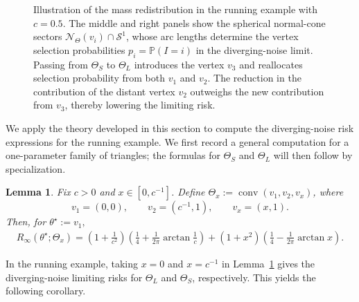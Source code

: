 \documentclass[11pt]{article}
\theoremstyle{plain}
\newtheorem{lemma}[theorem]{Lemma}
\theoremstyle{definition}
\newcommand{\mcN}{\mathcal{N}}
\newcommand{\inparen}[1]{\left(#1\right)}             %
\begin{document}
\begin{figure}
\caption{
Illustration of the mass redistribution in the running example with $c=0.5$. The middle and right panels show the spherical normal-cone sectors
$\mcN_\Theta(v_i)\cap\mathcal S^1$, whose arc lengths determine the vertex selection probabilities $p_i=\mathbb P(I=i)$ in the diverging-noise limit. Passing from $\Theta_S$ to $\Theta_L$ introduces the vertex $v_3$ and reallocates selection probability from both $v_1$ and $v_2$. The reduction in the contribution of the distant vertex $v_2$ outweighs the new contribution from $v_3$, thereby lowering the limiting risk.
}
\label{fig:angular-mass-redistribution}
\end{figure}


We apply the theory developed in this section to compute the diverging-noise risk expressions for the running example. We first record a general computation for a one-parameter family of triangles; the formulas for $\Theta_S$ and $\Theta_L$ will then follow by specialization.

\begin{lemma}\label{lem:ThetaARisk}
Fix $c>0$ and $x \in [0,c^{-1}]$. Define $\Theta_x := \operatorname{conv}(v_1, v_2, v_x)$, where
\[
v_1 = (0,0), \qquad
v_2 = (c^{-1},1), \qquad
v_x = (x,1).
\] 
Then, for $\theta^\star := v_1,$
\begin{align*}
R_\infty(\theta^\star; \Theta_x)
=
\inparen{1+\frac{1}{c^2}} \left(\frac14 + \frac{1}{2\pi} \arctan \frac1c \right)
+ (1+x^2)\left(\frac14 - \frac{1}{2\pi} \arctan x\right).
\end{align*}
\end{lemma}

In the running example, taking $x=0$ and $x=c^{-1}$ in
Lemma~\ref{lem:ThetaARisk} gives the diverging-noise limiting risks for
$\Theta_L$ and $\Theta_S$, respectively. This yields the following
corollary.
\end{document}
